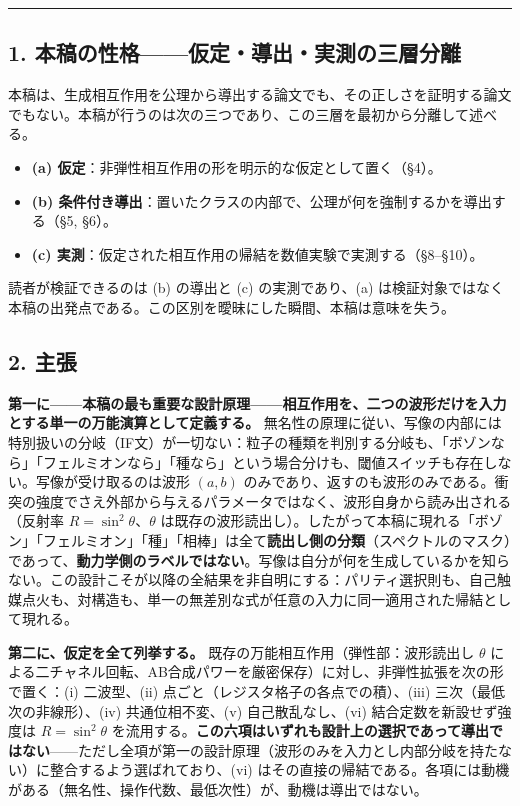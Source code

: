 \documentclass[
  a4paper,
]{ltjsarticle}
\providecommand{\tightlist}{%
  \setlength{\itemsep}{0pt}\setlength{\parskip}{0pt}}
\begin{document}
\begin{center}\rule{0.5\linewidth}{0.5pt}\end{center}

\subsection{1.
本稿の性格------仮定・導出・実測の三層分離}\label{ux672cux7a3fux306eux6027ux683cux4eeeux5b9aux5c0eux51faux5b9fux6e2cux306eux4e09ux5c64ux5206ux96e2}

本稿は、生成相互作用を公理から導出する論文でも、その正しさを証明する論文でもない。本稿が行うのは次の三つであり、この三層を最初から分離して述べる。

\begin{itemize}
\tightlist
\item
  \textbf{(a) 仮定}：非弾性相互作用の形を明示的な仮定として置く（§4）。
\item
  \textbf{(b)
  条件付き導出}：置いたクラスの内部で、公理が何を強制するかを導出する（§5,
  §6）。
\item
  \textbf{(c)
  実測}：仮定された相互作用の帰結を数値実験で実測する（§8--§10）。
\end{itemize}

読者が検証できるのは (b) の導出と (c) の実測であり、(a)
は検証対象ではなく本稿の出発点である。この区別を曖昧にした瞬間、本稿は意味を失う。

\subsection{2. 主張}\label{ux4e3bux5f35}

\textbf{第一に------本稿の最も重要な設計原理------相互作用を、二つの波形だけを入力とする単一の万能演算として定義する。}
無名性の原理に従い、写像の内部には特別扱いの分岐（IF文）が一切ない：粒子の種類を判別する分岐も、「ボゾンなら」「フェルミオンなら」「種なら」という場合分けも、閾値スイッチも存在しない。写像が受け取るのは波形
\((a,b)\)
のみであり、返すのも波形のみである。衝突の強度でさえ外部から与えるパラメータではなく、波形自身から読み出される（反射率
\(R=\sin^2\theta\)、\(\theta\)
は既存の波形読出し）。したがって本稿に現れる「ボゾン」「フェルミオン」「種」「相棒」は全て\textbf{読出し側の分類}（スペクトルのマスク）であって、\textbf{動力学側のラベルではない}。写像は自分が何を生成しているかを知らない。この設計こそが以降の全結果を非自明にする：パリティ選択則も、自己触媒点火も、対構造も、単一の無差別な式が任意の入力に同一適用された帰結として現れる。

\textbf{第二に、仮定を全て列挙する。}
既存の万能相互作用（弾性部：波形読出し \(\theta\)
による二チャネル回転、AB合成パワーを厳密保存）に対し、非弾性拡張を次の形で置く：(i)
二波型、(ii) 点ごと（レジスタ格子の各点での積）、(iii)
三次（最低次の非線形）、(iv) 共通位相不変、(v) 自己散乱なし、(vi)
結合定数を新設せず強度は \(R=\sin^2\theta\)
を流用する。\textbf{この六項はいずれも設計上の選択であって導出ではない}------ただし全項が第一の設計原理（波形のみを入力とし内部分岐を持たない）に整合するよう選ばれており、(vi)
はその直接の帰結である。各項には動機がある（無名性、操作代数、最低次性）が、動機は導出ではない。
\end{document}
